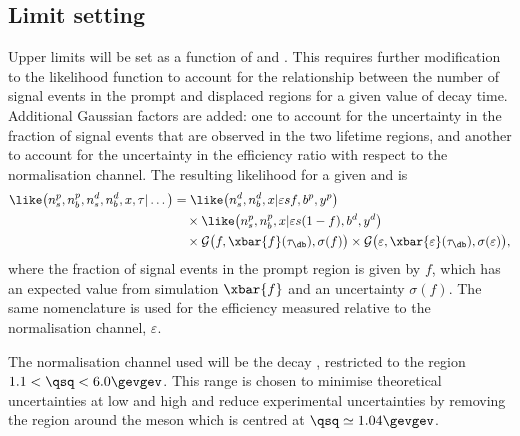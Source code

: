\subsection{Limit setting}
Upper limits will be set as a function of \mass{\db} and \lifetime{\db}.
This requires further modification to the likelihood function to account for the relationship
between the number of signal events in the prompt and displaced regions for a given value of
decay time.
Additional Gaussian factors are added: one to account for the uncertainty in the fraction of
signal events that are observed in the two lifetime regions, and another to account for the
uncertainty in the efficiency ratio with respect to the normalisation channel.
The resulting likelihood for a given \mass{\db} and \lifetime{\db} is
\begin{align}
  \like\big(n_s^p, n_b^p, n_s^d, n_b^d, x, \tau | \dots\big) &=
   \like\big(n_s^d, n_b^d, x | \varepsilon s f,b^p,y^p\big) \nonumber\\
   &\quad\times\like\big(n_s^p, n_b^p, x | \varepsilon s(1-f),b^d,y^d\big)\nonumber\\
   &\quad\times\mathcal{G}\big(f, \xbar{f}(\tau_\db),\sigma(f)\big)
   \times\mathcal{G}\big(\varepsilon, \xbar{\varepsilon}(\tau_\db),\sigma(\varepsilon)\big),
   \label{eq:db:lim}
\end{align}
where the fraction of signal events in the prompt region is given by $f$,
which has an expected value from simulation $\xbar{f}$ and an uncertainty $\sigma(f)$.
The same nomenclature is used for the efficiency measured relative to the normalisation channel,
$\varepsilon$.

The normalisation channel used will be the \sm decay \btokstrmumu, restricted to the region
$1.1<\qsq<6.0\gevgev$.
This range is chosen to minimise theoretical uncertainties at low and high \qsq and reduce
experimental uncertainties by removing the region around the \phii meson which is centred at
$\qsq\simeq1.04\gevgev$.



